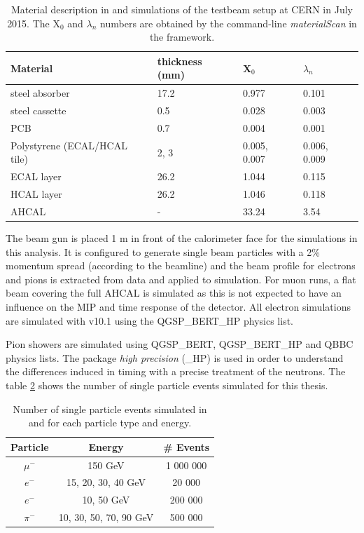 \begin{table}[htb!]
  \centering
  \caption{Material description in \mokka and \ddhep simulations of the testbeam setup at CERN in July 2015. The X$_0$ and $\lambda_n$ numbers are obtained by the command-line \textit{materialScan} in the \ddhep framework.}
  \label{table:material_sim}
  \begin{tabular}{@{} p{6cm}|l||l|l @{}}
    \hline
    Material & thickness (mm) & X$_0$ & $\lambda_n$ \\
    \hline
    \hline
    steel absorber & 17.2 & 0.977 & 0.101\\
    \hline
    steel cassette & 0.5 & 0.028 & 0.003\\
    \hline
    PCB & 0.7 & 0.004 & 0.001\\
    \hline
    Polystyrene (ECAL/HCAL tile) & 2, 3 & 0.005, 0.007 & 0.006, 0.009\\
    \hline
    \hline
    ECAL layer & 26.2 & 1.044 & 0.115\\
    HCAL layer & 26.2 & 1.046 & 0.118\\
    \hline
    AHCAL & - & 33.24 & 3.54\\
    \hline
  \end{tabular}
\end{table}

The beam gun is placed 1 m in front of the calorimeter face for the simulations in this analysis. It is configured to generate single beam particles with a 2\% momentum spread (according to the beamline) and the beam profile for electrons and pions is extracted from data and applied to simulation. For muon runs, a flat beam covering the full AHCAL is simulated as this is not expected to have an influence on the MIP and time response of the detector. All electron simulations are simulated with \geant v10.1 using the QGSP\_BERT\_HP physics list.

Pion showers are simulated using QGSP\_BERT, QGSP\_BERT\_HP and QBBC physics lists. The package \textit{high precision} (\_HP) is used in order to understand the differences induced in timing with a precise treatment of the neutrons. The table \ref{table:event_sim} shows the number of single particle events simulated for this thesis.

\begin{table}[htb!]
  \centering
  \caption{Number of single particle events simulated in \mokka and \ddhep for each particle type and energy.}
  \label{table:event_sim}
  \begin{tabular}{@{} ccc @{}}
    \hline
    Particle & Energy & \# Events \\
    \hline
    $\mu^-$ & 150 GeV & 1 000 000 \\
    \hline
    $e^-$ & 15, 20, 30, 40 GeV & 20 000 \\
    $e^-$ & 10, 50 GeV & 200 000 \\
    \hline
    $\pi^-$ & 10, 30, 50, 70, 90 GeV & 500 000 \\
    \hline
  \end{tabular}
\end{table}

